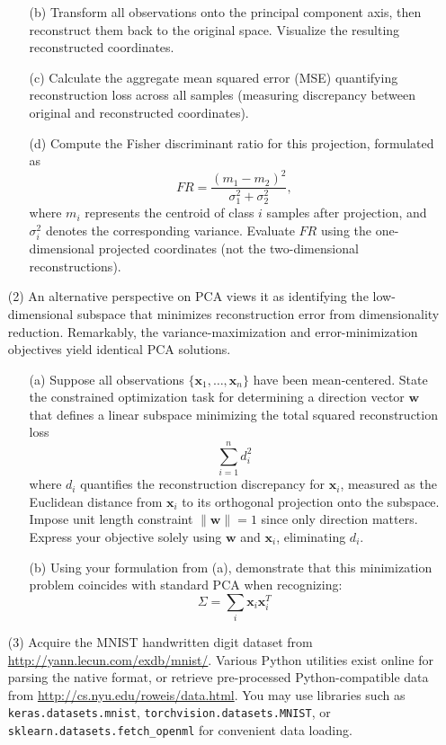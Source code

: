 \documentclass[11pt,addpoints,answers]{exam}
\begin{document}
\begin{enumerate}
\begin{enumerate}
			\item[(b)] Transform all observations onto the principal component axis, then reconstruct them back to the original space. Visualize the resulting reconstructed coordinates.
			
			\item[(c)] Calculate the aggregate mean squared error (MSE) quantifying reconstruction loss across all samples (measuring discrepancy between original and reconstructed coordinates).
			
			\item[(d)] Compute the Fisher discriminant ratio for this projection, formulated as 
			\[
			FR = \frac{(m_{1} - m_{2})^{2}}{\sigma_{1}^{2} + \sigma_{2}^{2}},
			\]
			where $m_{i}$ represents the centroid of class $i$ samples after projection, and $\sigma_{i}^{2}$ denotes the corresponding variance. Evaluate $FR$ using the one-dimensional projected coordinates (not the two-dimensional reconstructions).
		\end{enumerate}
		
		\item[(2)] An alternative perspective on PCA views it as identifying the low-dimensional subspace that minimizes reconstruction error from dimensionality reduction. Remarkably, the variance-maximization and error-minimization objectives yield identical PCA solutions.
		
		\begin{enumerate}
			\item[(a)] Suppose all observations $\{\mathbf{x}_{1}, \dots, \mathbf{x}_{n}\}$ have been mean-centered. State the constrained optimization task for determining a direction vector $\mathbf{w}$ that defines a linear subspace minimizing the total squared reconstruction loss
			\[
			\sum_{i=1}^{n} d_{i}^{2}
			\]
			where $d_{i}$ quantifies the reconstruction discrepancy for $\mathbf{x}_{i}$, measured as the Euclidean distance from $\mathbf{x}_{i}$ to its orthogonal projection onto the subspace. Impose unit length constraint $\|\mathbf{w}\|=1$ since only direction matters. Express your objective solely using $\mathbf{w}$ and $\mathbf{x}_{i}$, eliminating $d_{i}$.
			
			\item[(b)] Using your formulation from (a), demonstrate that this minimization problem coincides with standard PCA when recognizing: 
			\[
			\Sigma = \sum_{i} \mathbf{x}_{i} \mathbf{x}_{i}^{T}
			\]
		\end{enumerate}
		
		
		\item[(3)] Acquire the MNIST handwritten digit dataset from \url{http://yann.lecun.com/exdb/mnist/}. Various Python utilities exist online for parsing the native format, or retrieve pre-processed Python-compatible data from \url{http://cs.nyu.edu/roweis/data.html}. You may use libraries such as \texttt{keras.datasets.mnist}, \texttt{torchvision.datasets.MNIST}, or\\ \texttt{sklearn.datasets.fetch\_openml} for convenient data loading.
		

\end{enumerate}
\end{document}
